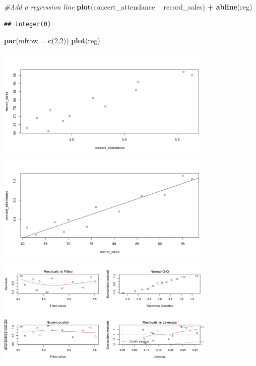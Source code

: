 \documentclass[]{book}
\newenvironment{Shaded}{\begin{snugshade}}{\end{snugshade}}
\newcommand{\CommentTok}[1]{\textcolor[rgb]{0.56,0.35,0.01}{\textit{#1}}}
\newcommand{\DataTypeTok}[1]{\textcolor[rgb]{0.13,0.29,0.53}{#1}}
\newcommand{\DecValTok}[1]{\textcolor[rgb]{0.00,0.00,0.81}{#1}}
\newcommand{\KeywordTok}[1]{\textcolor[rgb]{0.13,0.29,0.53}{\textbf{#1}}}
\newcommand{\NormalTok}[1]{#1}
\newcommand{\OperatorTok}[1]{\textcolor[rgb]{0.81,0.36,0.00}{\textbf{#1}}}
\newcommand{\StringTok}[1]{\textcolor[rgb]{0.31,0.60,0.02}{#1}}
\begin{document}
\begin{Shaded}
\begin{Highlighting}[]
\CommentTok{#Add a regression line}
\KeywordTok{plot}\NormalTok{(concert_attendance }\OperatorTok{~}\StringTok{ }\NormalTok{record_sales) }\OperatorTok{+}\StringTok{ }\KeywordTok{abline}\NormalTok{(reg)}
\end{Highlighting}
\end{Shaded}

\begin{verbatim}
## integer(0)
\end{verbatim}

\begin{Shaded}
\begin{Highlighting}[]
\KeywordTok{par}\NormalTok{(}\DataTypeTok{mfrow =} \KeywordTok{c}\NormalTok{(}\DecValTok{2}\NormalTok{,}\DecValTok{2}\NormalTok{))}
\KeywordTok{plot}\NormalTok{(reg)}
\end{Highlighting}
\end{Shaded}

\begin{center}\includegraphics[width=0.8\textwidth]{figure/q1-1} \includegraphics[width=0.8\textwidth]{figure/q1-2} \includegraphics[width=0.8\textwidth]{figure/q1-3} \end{center}
\end{document}

